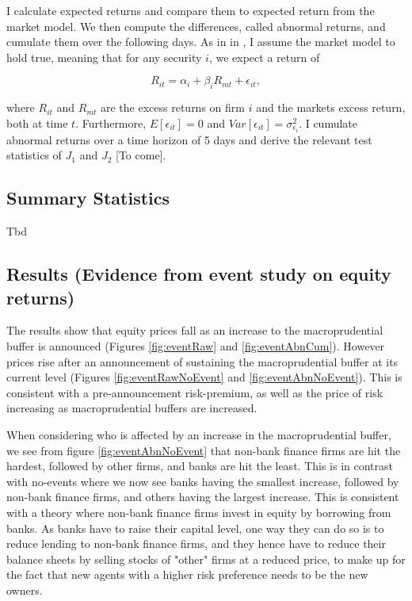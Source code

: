 \documentclass[11pt]{article}
\begin{document}
I calculate expected returns and compare them to expected return from the market model. We then compute the differences, called abnormal returns, and cumulate them over the following days. As in in \citet{Campbell1997}, I assume the market model to hold true, meaning that for any security $i$, we expect a return of 

\begin{equation}
R_{it} = \alpha_i + \beta_i  R_{mt} + \epsilon_{it},
\end{equation}

where $R_{it}$ and $R_{mt}$ are the excess returns on firm $i$ and the markets excess return, both at time $t$. Furthermore, $E[\epsilon_{it}] = 0$ and $Var[\epsilon_{it}] = \sigma^2_{\epsilon_{i}}$. I cumulate abnormal returns over a time horizon of 5 days and derive the relevant test statistics of $J_1$ and $J_2$ [To come].




\subsection{Summary Statistics}
Tbd


\subsection{Results (Evidence from event study on equity returns)}

The results show that equity prices fall as an increase to the macroprudential buffer is announced (Figures \ref{fig:eventRaw} and \ref{fig:eventAbnCum}). However prices rise after an announcement of sustaining the macroprudential buffer at its current level (Figures \ref{fig:eventRawNoEvent} and \ref{fig:eventAbnNoEvent}). This is consistent with a pre-announcement risk-premium, as well as the price of risk increasing as macroprudential buffers are increased.

When considering who is affected by an increase in the macroprudential buffer, we see from figure \ref{fig:eventAbnNoEvent} that non-bank finance firms are hit the hardest, followed by other firms, and banks are hit the least. This is in contrast with no-events where we now see banks having the smallest increase, followed by non-bank finance firms, and others having the largest increase. This is consistent with a theory where non-bank finance firms invest in equity by borrowing from banks. As banks have to raise their capital level, one way they can do so is to reduce lending to non-bank finance firms, and they hence have to reduce their balance sheets by selling stocks of "other" firms at a reduced price, to make up for the fact that new agents with a higher risk preference needs to be the new owners. 
\end{document}
